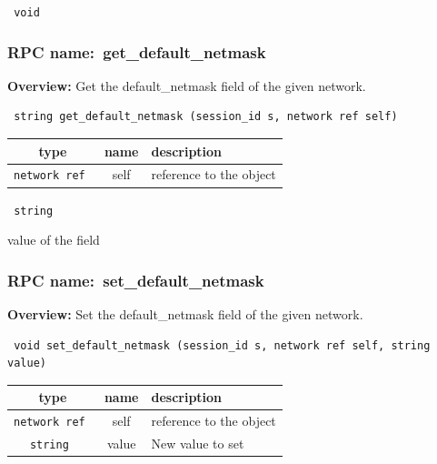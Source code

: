 \vspace{0.3cm}

{\tt 
void
}



\vspace{0.3cm}
\vspace{0.3cm}
\vspace{0.3cm}
\subsubsection{RPC name:~get\_default\_netmask}

{\bf Overview:} 
Get the default\_netmask field of the given network.

\begin{verbatim} string get_default_netmask (session_id s, network ref self)\end{verbatim}



 
\vspace{0.3cm}
\begin{tabular}{|c|c|p{7cm}|}
 \hline
{\bf type} & {\bf name} & {\bf description} \\ \hline
{\tt network ref } & self & reference to the object \\ \hline 

\end{tabular}

\vspace{0.3cm}

{\tt 
string
}


value of the field
\vspace{0.3cm}
\vspace{0.3cm}
\vspace{0.3cm}
\subsubsection{RPC name:~set\_default\_netmask}

{\bf Overview:} 
Set the default\_netmask field of the given network.

\begin{verbatim} void set_default_netmask (session_id s, network ref self, string value)\end{verbatim}



 
\vspace{0.3cm}
\begin{tabular}{|c|c|p{7cm}|}
 \hline
{\bf type} & {\bf name} & {\bf description} \\ \hline
{\tt network ref } & self & reference to the object \\ \hline 

{\tt string } & value & New value to set \\ \hline 

\end{tabular}

